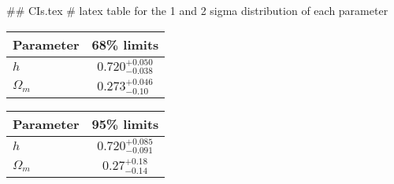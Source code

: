 ## CIs.tex
# latex table for the 1 and 2 sigma distribution of each parameter

\begin{tabular} { l  c}
 Parameter &  68\% limits\\
\hline
{\boldmath$h              $} & $0.720^{+0.050}_{-0.038}   $\\
{\boldmath$\Omega_m       $} & $0.273^{+0.046}_{-0.10}    $\\
\hline
\end{tabular}

\begin{tabular} { l  c}
 Parameter &  95\% limits\\
\hline
{\boldmath$h              $} & $0.720^{+0.085}_{-0.091}   $\\
{\boldmath$\Omega_m       $} & $0.27^{+0.18}_{-0.14}      $\\
\hline
\end{tabular}
